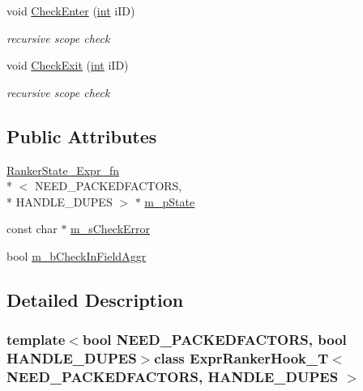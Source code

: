 \begin{DoxyCompactItemize}
\item 
void \hyperlink{classExprRankerHook__T_a64a8feda36791b55c154c0fdb298e8c8}{Check\-Enter} (\hyperlink{sphinxexpr_8cpp_a4a26e8f9cb8b736e0c4cbf4d16de985e}{int} i\-I\-D)
\begin{DoxyCompactList}\small\item\em recursive scope check \end{DoxyCompactList}\item 
void \hyperlink{classExprRankerHook__T_ae341996894356a1c00981ac3ae2d3d9d}{Check\-Exit} (\hyperlink{sphinxexpr_8cpp_a4a26e8f9cb8b736e0c4cbf4d16de985e}{int} i\-I\-D)
\begin{DoxyCompactList}\small\item\em recursive scope check \end{DoxyCompactList}\end{DoxyCompactItemize}
\subsection*{Public Attributes}
\begin{DoxyCompactItemize}
\item 
\hyperlink{structRankerState__Expr__fn}{Ranker\-State\-\_\-\-Expr\-\_\-fn}\\*
$<$ N\-E\-E\-D\-\_\-\-P\-A\-C\-K\-E\-D\-F\-A\-C\-T\-O\-R\-S, \\*
H\-A\-N\-D\-L\-E\-\_\-\-D\-U\-P\-E\-S $>$ $\ast$ \hyperlink{classExprRankerHook__T_a12de2c7f7c3091e0f0bc89dd29a7a7ec}{m\-\_\-p\-State}
\item 
const char $\ast$ \hyperlink{classExprRankerHook__T_ab7b5eaeeb5502970c487b0b83d5f2647}{m\-\_\-s\-Check\-Error}
\item 
bool \hyperlink{classExprRankerHook__T_a827bfc58e9a915309e59c62eacaf55b4}{m\-\_\-b\-Check\-In\-Field\-Aggr}
\end{DoxyCompactItemize}


\subsection{Detailed Description}
\subsubsection*{template$<$bool N\-E\-E\-D\-\_\-\-P\-A\-C\-K\-E\-D\-F\-A\-C\-T\-O\-R\-S, bool H\-A\-N\-D\-L\-E\-\_\-\-D\-U\-P\-E\-S$>$class Expr\-Ranker\-Hook\-\_\-\-T$<$ N\-E\-E\-D\-\_\-\-P\-A\-C\-K\-E\-D\-F\-A\-C\-T\-O\-R\-S, H\-A\-N\-D\-L\-E\-\_\-\-D\-U\-P\-E\-S $>$}

